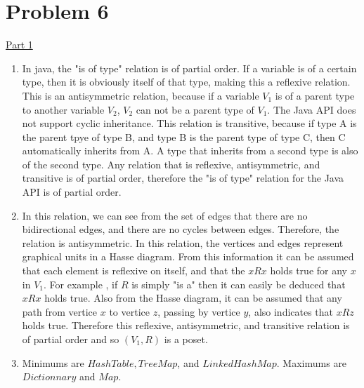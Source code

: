 \documentclass[12pt]{article}
\begin{document}
\section*{Problem 6}
\noindent\underline{Part 1}\\
\begin{enumerate}
\item In java, the "is of type" relation is of partial order. If a variable is of a certain type, then it is obviously itself of that type, making this a reflexive relation. This is an antisymmetric relation, because if a variable $V_{1}$ is of a parent type to another variable $V_{2}$,   $V_{2}$ can not be a parent type of $V_{1}$. The Java API does not support cyclic inheritance. This relation is transitive, because if type A is the parent tpye of type B, and type B is the parent type of type C, then C automatically inherits from A. A type that inherits from a second type is also of the second type. Any relation that is reflexive, antisymmetric, and transitive is of partial order, therefore the "is of type" relation for the Java API is of partial order.
\item In this relation, we can see from the set of edges that there are no bidirectional edges, and there are no cycles between edges. Therefore, the relation is antisymmetric. In this relation, the vertices and edges represent graphical units in a Hasse diagram. From this information it can be assumed that each element is reflexive on itself, and that the $xRx$ holds true for any $x$ in $V_{1}$. For example , if $R$ is simply "is a" then it can easily be deduced that $xRx$ holds true. Also from the Hasse diagram, it can be assumed that any path from vertice $x$ to vertice $z$, passing by vertice $y$, also indicates that $xRz$ holds true. Therefore this reflexive, antisymmetric, and transitive relation is of partial order and so $(V_{1},R)$ is a poset.
\item Minimums are $HashTable, TreeMap$, and $LinkedHashMap$. Maximums are $Dictionnary$ and $Map$.\\

\end{enumerate}
\end{document}
